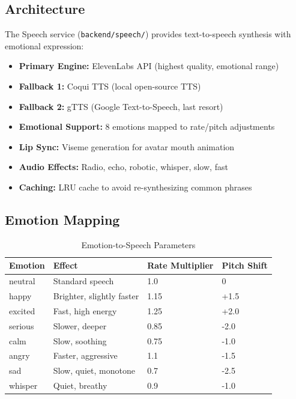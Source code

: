 \documentclass[12pt,a4paper,twoside]{report}
\begin{document}
\subsection{Architecture}

The Speech service (\texttt{backend/speech/}) provides text-to-speech synthesis with emotional expression:

\begin{itemize}
    \item \textbf{Primary Engine:} ElevenLabs API (highest quality, emotional range)
    \item \textbf{Fallback 1:} Coqui TTS (local open-source TTS)
    \item \textbf{Fallback 2:} gTTS (Google Text-to-Speech, last resort)
    \item \textbf{Emotional Support:} 8 emotions mapped to rate/pitch adjustments
    \item \textbf{Lip Sync:} Viseme generation for avatar mouth animation
    \item \textbf{Audio Effects:} Radio, echo, robotic, whisper, slow, fast
    \item \textbf{Caching:} LRU cache to avoid re-synthesizing common phrases
\end{itemize}

\subsection{Emotion Mapping}

\begin{table}[H]
\centering
\begin{tabularx}{\textwidth}{|l|X|l|l|}
\hline
\rowcolor{phiblue!20}
\textbf{Emotion} & \textbf{Effect} & \textbf{Rate Multiplier} & \textbf{Pitch Shift} \\
\hline
neutral & Standard speech & 1.0 & 0 \\
\hline
happy & Brighter, slightly faster & 1.15 & +1.5 \\
\hline
excited & Fast, high energy & 1.25 & +2.0 \\
\hline
serious & Slower, deeper & 0.85 & -2.0 \\
\hline
calm & Slow, soothing & 0.75 & -1.0 \\
\hline
angry & Faster, aggressive & 1.1 & -1.5 \\
\hline
sad & Slow, quiet, monotone & 0.7 & -2.5 \\
\hline
whisper & Quiet, breathy & 0.9 & -1.0 \\
\hline
\end{tabularx}
\caption{Emotion-to-Speech Parameters}
\end{table}
\end{document}
